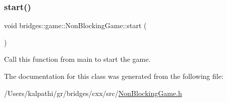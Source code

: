 \subsubsection{\texorpdfstring{start()}{start()}}
{\footnotesize\ttfamily void bridges\+::game\+::\+Non\+Blocking\+Game\+::start (\begin{DoxyParamCaption}{ }\end{DoxyParamCaption})\hspace{0.3cm}{\ttfamily [inline]}}



Call this function from main to start the game. 



The documentation for this class was generated from the following file\+:\begin{DoxyCompactItemize}
\item 
/\+Users/kalpathi/gr/bridges/cxx/src/\mbox{\hyperlink{_non_blocking_game_8h}{Non\+Blocking\+Game.\+h}}\end{DoxyCompactItemize}

